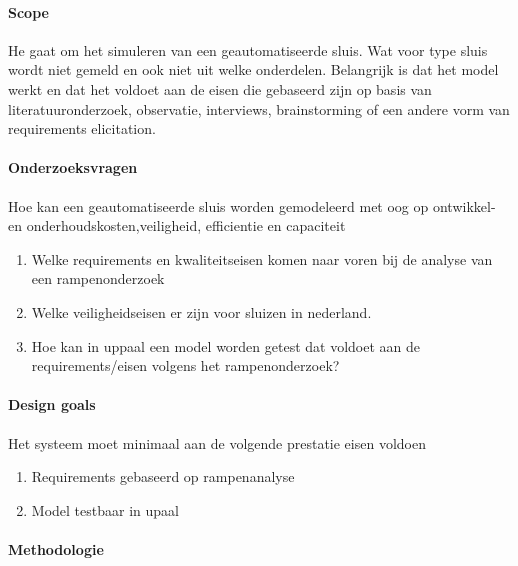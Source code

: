 \documentclass{article}
\begin{document}
	\paragraph{Scope}
	
	He gaat om het simuleren van een geautomatiseerde sluis. Wat voor type sluis wordt niet gemeld en ook niet uit welke onderdelen. Belangrijk is dat het model werkt en dat het voldoet aan de eisen die gebaseerd zijn op basis van literatuuronderzoek, observatie, interviews, brainstorming of een andere vorm van requirements elicitation.
	
	\paragraph{Onderzoeksvragen }
	
	Hoe kan een geautomatiseerde sluis worden gemodeleerd met oog op ontwikkel- en onderhoudskosten,veiligheid, efficientie en capaciteit
	
	
	
	
	
	\begin{enumerate}
		
		\item Welke requirements en kwaliteitseisen komen naar voren bij de analyse van een rampenonderzoek
		\item Welke veiligheidseisen er zijn voor sluizen in nederland. 
		\item Hoe kan in uppaal  een model worden getest dat voldoet aan de requirements/eisen volgens het rampenonderzoek?
	\end{enumerate}
	
	
	
	\paragraph{Design goals}
	Het systeem moet minimaal aan de volgende prestatie eisen voldoen 
	
	\begin{enumerate}
		\item   Requirements gebaseerd op rampenanalyse
		\item Model testbaar in upaal
	\end{enumerate}
	
	\paragraph{Methodologie}
	\cite{RijnensupervisorsynthesisLock}
\end{document}
